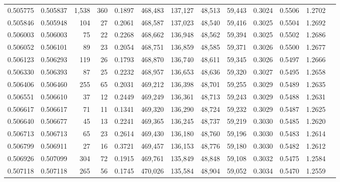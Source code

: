 \begin{tabular}{rrrrrrrrrrrrr}
0.505775 & 0.505837 & 1,538 &   360 &                                     0.1897 & 468,483 & 137,127 &  48,513 &  59,443 & 0.3024 & 0.5506 & 1.2702 \\
0.505846 & 0.505948 &   104 &    27 &                                     0.2061 & 468,587 & 137,023 &  48,540 &  59,416 & 0.3025 & 0.5504 & 1.2692 \\
0.506003 & 0.506003 &    75 &    22 &                                     0.2268 & 468,662 & 136,948 &  48,562 &  59,394 & 0.3025 & 0.5502 & 1.2686 \\
0.506052 & 0.506101 &    89 &    23 &                                     0.2054 & 468,751 & 136,859 &  48,585 &  59,371 & 0.3026 & 0.5500 & 1.2677 \\
0.506123 & 0.506293 &   119 &    26 &                                     0.1793 & 468,870 & 136,740 &  48,611 &  59,345 & 0.3026 & 0.5497 & 1.2666 \\
0.506330 & 0.506393 &    87 &    25 &                                     0.2232 & 468,957 & 136,653 &  48,636 &  59,320 & 0.3027 & 0.5495 & 1.2658 \\
0.506406 & 0.506460 &   255 &    65 &                                     0.2031 & 469,212 & 136,398 &  48,701 &  59,255 & 0.3029 & 0.5489 & 1.2635 \\
0.506551 & 0.506610 &    37 &    12 &                                     0.2449 & 469,249 & 136,361 &  48,713 &  59,243 & 0.3029 & 0.5488 & 1.2631 \\
0.506617 & 0.506617 &    71 &    11 &                                     0.1341 & 469,320 & 136,290 &  48,724 &  59,232 & 0.3029 & 0.5487 & 1.2625 \\
0.506640 & 0.506677 &    45 &    13 &                                     0.2241 & 469,365 & 136,245 &  48,737 &  59,219 & 0.3030 & 0.5485 & 1.2620 \\
0.506713 & 0.506713 &    65 &    23 &                                     0.2614 & 469,430 & 136,180 &  48,760 &  59,196 & 0.3030 & 0.5483 & 1.2614 \\
0.506799 & 0.506911 &    27 &    16 &                                     0.3721 & 469,457 & 136,153 &  48,776 &  59,180 & 0.3030 & 0.5482 & 1.2612 \\
0.506926 & 0.507099 &   304 &    72 &                                     0.1915 & 469,761 & 135,849 &  48,848 &  59,108 & 0.3032 & 0.5475 & 1.2584 \\
0.507118 & 0.507118 &   265 &    56 &                                     0.1745 & 470,026 & 135,584 &  48,904 &  59,052 & 0.3034 & 0.5470 & 1.2559 \\

\end{tabular}
